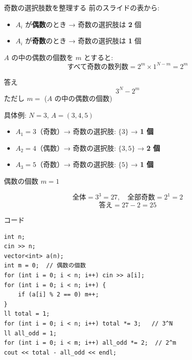 \documentclass[dvipdfmx,aspectratio=169]{beamer}
\begin{document}
\begin{frame}{奇数の選択肢数を整理する}
  前のスライドの表から:
  \begin{itemize}
    \item $A_i$ が\textbf{偶数}のとき → 奇数の選択肢は \textbf{2} 個
    \item $A_i$ が\textbf{奇数}のとき → 奇数の選択肢は \textbf{1} 個
  \end{itemize}

  \vspace{0.8em}
  $A$ の中の偶数の個数を $m$ とすると:
  \[
    \text{すべて奇数の数列数} = 2^m \times 1^{N-m} = 2^m
  \]

  \vspace{0.8em}
  \begin{alertblock}{答え}
    \[
      3^N - 2^m
    \]
    ただし $m = $ ($A$ の中の偶数の個数)
  \end{alertblock}
\end{frame}

\begin{frame}{具体例: $N=3$, $A = (3, 4, 5)$}
  \begin{itemize}
    \item $A_1 = 3$（奇数）→ 奇数の選択肢: $\{3\}$ → \textbf{1 個}
    \item $A_2 = 4$（偶数）→ 奇数の選択肢: $\{3, 5\}$ → \textbf{2 個}
    \item $A_3 = 5$（奇数）→ 奇数の選択肢: $\{5\}$ → \textbf{1 個}
  \end{itemize}

  \vspace{0.8em}
  偶数の個数 $m = 1$

  \vspace{0.5em}
  \[
    \text{全体} = 3^3 = 27, \quad \text{全部奇数} = 2^1 = 2
  \]
  \[
    \text{答え} = 27 - 2 = 25
  \]
\end{frame}

\begin{frame}[fragile]{コード}
\begin{verbatim}
int n;
cin >> n;
vector<int> a(n);
int m = 0;  // 偶数の個数
for (int i = 0; i < n; i++) cin >> a[i];
for (int i = 0; i < n; i++) {
    if (a[i] % 2 == 0) m++;
}
ll total = 1;
for (int i = 0; i < n; i++) total *= 3;   // 3^N
ll all_odd = 1;
for (int i = 0; i < m; i++) all_odd *= 2;  // 2^m
cout << total - all_odd << endl;
\end{verbatim}
\end{frame}
\end{document}

